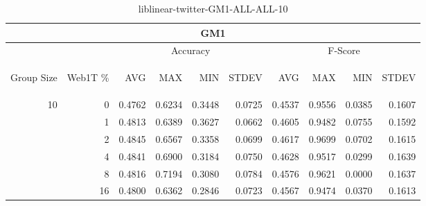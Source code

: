 \begin{center}
\begin{table}[htbp]
\begin{tabular}{ | r | r | r | r | r | r | r | r | r | r |}
\hline
\multicolumn{10}{|c|}{GM1}\\
\hline
 & & \multicolumn{4}{|c|}{Accuracy} & \multicolumn{4}{|c|}{F-Score}\\ \cline{3-10}
\begin{sideways}Group Size\end{sideways} & \begin{sideways}Web1T \%\end{sideways} & \begin{sideways}AVG\end{sideways} & \begin{sideways}MAX\end{sideways} & \begin{sideways}MIN\end{sideways} & \begin{sideways}STDEV\end{sideways} & \begin{sideways}AVG\end{sideways} & \begin{sideways}MAX\end{sideways} & \begin{sideways}MIN\end{sideways} & \begin{sideways}STDEV\end{sideways}\\
\hline
\multirow{6}{*}{10}
 & 0 & 0.4762 & 0.6234 & 0.3448 & 0.0725 & 0.4537 & 0.9556 & 0.0385 & 0.1607\\ \cline{2-10}
 & 1 & 0.4813 & 0.6389 & 0.3627 & 0.0662 & 0.4605 & 0.9482 & 0.0755 & 0.1592\\ \cline{2-10}
 & 2 & 0.4845 & 0.6567 & 0.3358 & 0.0699 & 0.4617 & 0.9699 & 0.0702 & 0.1615\\ \cline{2-10}
 & 4 & 0.4841 & 0.6900 & 0.3184 & 0.0750 & 0.4628 & 0.9517 & 0.0299 & 0.1639\\ \cline{2-10}
 & 8 & 0.4816 & 0.7194 & 0.3080 & 0.0784 & 0.4576 & 0.9621 & 0.0000 & 0.1637\\ \cline{2-10}
 & 16 & 0.4800 & 0.6362 & 0.2846 & 0.0723 & 0.4567 & 0.9474 & 0.0370 & 0.1613\\ \cline{2-10}
\hline
\end{tabular}
\caption{liblinear-twitter-GM1-ALL-ALL-10}
\end{table}
\end{center}

